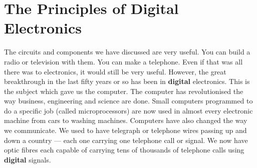 \section{The Principles of Digital Electronics}

The circuits and components we have discussed are very useful.  You can build a radio or television with them.  You can make a telephone.  Even if that was all there was to electronics, it would still be very useful.  However, the great breakthrough in the last fifty years or so has been in {\bf digital} electronics.  This is the subject which gave us the computer.  The computer has revolutionised the way business, engineering and science are done.  Small computers programmed to do a specific job (called microprocessors) are now used in almost every electronic machine from cars to washing machines.  Computers have also changed the way we communicate.  We used to have telegraph or telephone wires passing up and down a country --- each one carrying one telephone call or signal.  We now have optic fibres each capable of carrying tens of thousands of telephone calls using {\bf digital} signals.


